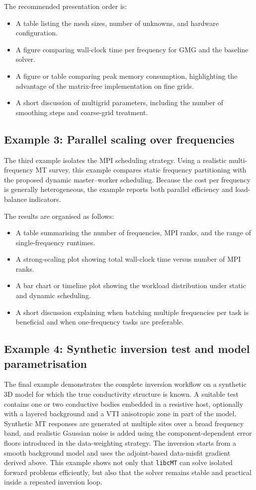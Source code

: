 \documentclass{article}
\begin{document}
The recommended presentation order is:
\begin{itemize}
  \item A table listing the mesh sizes, number of unknowns, and hardware configuration.
  \item A figure comparing wall-clock time per frequency for GMG and the baseline solver.
  \item A figure or table comparing peak memory consumption, highlighting the advantage of the matrix-free implementation on fine grids.
  \item A short discussion of multigrid parameters, including the number of smoothing steps and coarse-grid treatment.
\end{itemize}

\subsection{Example 3: Parallel scaling over frequencies}

The third example isolates the MPI scheduling strategy. Using a realistic multi-frequency MT survey, this example compares static frequency partitioning with the proposed dynamic master--worker scheduling. Because the cost per frequency is generally heterogeneous, the example reports both parallel efficiency and load-balance indicators.

The results are organised as follows:
\begin{itemize}
  \item A table summarising the number of frequencies, MPI ranks, and the range of single-frequency runtimes.
  \item A strong-scaling plot showing total wall-clock time versus number of MPI ranks.
  \item A bar chart or timeline plot showing the workload distribution under static and dynamic scheduling.
  \item A short discussion explaining when batching multiple frequencies per task is beneficial and when one-frequency tasks are preferable.
\end{itemize}

\subsection{Example 4: Synthetic inversion test and model parametrisation}

The final example demonstrates the complete inversion workflow on a synthetic 3D model for which the true conductivity structure is known. A suitable test contains one or two conductive bodies embedded in a resistive host, optionally with a layered background and a VTI anisotropic zone in part of the model. Synthetic MT responses are generated at multiple sites over a broad frequency band, and realistic Gaussian noise is added using the component-dependent error floors introduced in the data-weighting strategy. The inversion starts from a smooth background model and uses the adjoint-based data-misfit gradient derived above. This example shows not only that \texttt{libcMT} can solve isolated forward problems efficiently, but also that the solver remains stable and practical inside a repeated inversion loop.
\end{document}
